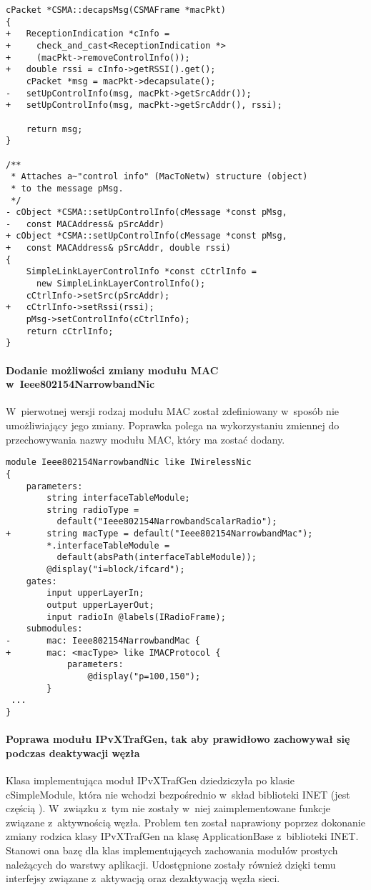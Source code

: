 \begin{verbatim}
cPacket *CSMA::decapsMsg(CSMAFrame *macPkt)
{
+   ReceptionIndication *cInfo =
+     check_and_cast<ReceptionIndication *>
+     (macPkt->removeControlInfo());
+   double rssi = cInfo->getRSSI().get();
    cPacket *msg = macPkt->decapsulate();
-   setUpControlInfo(msg, macPkt->getSrcAddr());
+   setUpControlInfo(msg, macPkt->getSrcAddr(), rssi);

    return msg;
}

/**
 * Attaches a~"control info" (MacToNetw) structure (object)
 * to the message pMsg.
 */
- cObject *CSMA::setUpControlInfo(cMessage *const pMsg,
-   const MACAddress& pSrcAddr)
+ cObject *CSMA::setUpControlInfo(cMessage *const pMsg,
+   const MACAddress& pSrcAddr, double rssi)
{
    SimpleLinkLayerControlInfo *const cCtrlInfo =
      new SimpleLinkLayerControlInfo();
    cCtrlInfo->setSrc(pSrcAddr);
+   cCtrlInfo->setRssi(rssi);
    pMsg->setControlInfo(cCtrlInfo);
    return cCtrlInfo;
}
\end{verbatim}

\paragraph{Dodanie możliwości zmiany modułu MAC w~Ieee802154NarrowbandNic} W~pierwotnej wersji rodzaj modułu MAC został zdefiniowany w~sposób nie umożliwiający jego zmiany. Poprawka polega na wykorzystaniu zmiennej do przechowywania nazwy modułu MAC, który ma zostać dodany.
\begin{verbatim}
module Ieee802154NarrowbandNic like IWirelessNic
{
    parameters:
        string interfaceTableModule;
        string radioType =
          default("Ieee802154NarrowbandScalarRadio");
+       string macType = default("Ieee802154NarrowbandMac");
        *.interfaceTableModule =
          default(absPath(interfaceTableModule));
        @display("i=block/ifcard");
    gates:
        input upperLayerIn;
        output upperLayerOut;
        input radioIn @labels(IRadioFrame);
    submodules:
-       mac: Ieee802154NarrowbandMac {
+       mac: <macType> like IMACProtocol {
            parameters:
                @display("p=100,150");
        }
 ...
}
\end{verbatim}

\paragraph{Poprawa modułu IPvXTrafGen, tak aby prawidłowo zachowywał się podczas deaktywacji węzła} Klasa implementująca moduł IPvXTrafGen dziedziczyła po klasie cSimpleModule, która nie wchodzi bezpośrednio w~skład biblioteki INET (jest częścią \omnetpp). W~związku z~tym nie zostały w~niej zaimplementowane funkcje związane z~aktywnością węzła. Problem ten został naprawiony poprzez dokonanie zmiany rodzica klasy IPvXTrafGen na klasę ApplicationBase z~biblioteki INET. Stanowi ona bazę dla klas implementujących zachowania modułów prostych należących do warstwy aplikacji. Udostępnione zostały również dzięki temu interfejsy związane z~aktywacją oraz dezaktywacją węzła sieci.

